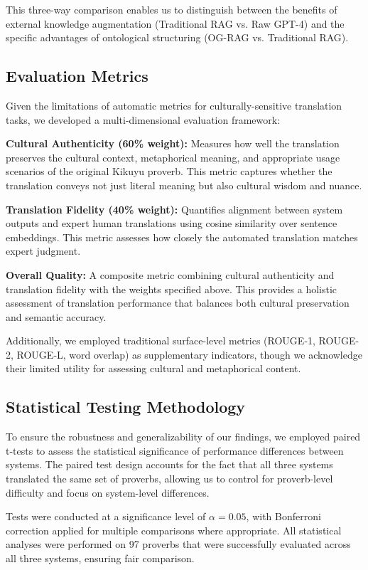 This three-way comparison enables us to distinguish between the benefits of external knowledge augmentation (Traditional RAG vs. Raw GPT-4) and the specific advantages of ontological structuring (OG-RAG vs. Traditional RAG).

\subsection{Evaluation Metrics}

Given the limitations of automatic metrics for culturally-sensitive translation tasks, we developed a multi-dimensional evaluation framework:

\textbf{Cultural Authenticity (60\% weight):} Measures how well the translation preserves the cultural context, metaphorical meaning, and appropriate usage scenarios of the original Kikuyu proverb. This metric captures whether the translation conveys not just literal meaning but also cultural wisdom and nuance.

\textbf{Translation Fidelity (40\% weight):} Quantifies alignment between system outputs and expert human translations using cosine similarity over sentence embeddings. This metric assesses how closely the automated translation matches expert judgment.

\textbf{Overall Quality:} A composite metric combining cultural authenticity and translation fidelity with the weights specified above. This provides a holistic assessment of translation performance that balances both cultural preservation and semantic accuracy.

Additionally, we employed traditional surface-level metrics (ROUGE-1, ROUGE-2, ROUGE-L, word overlap) as supplementary indicators, though we acknowledge their limited utility for assessing cultural and metaphorical content.

\subsection{Statistical Testing Methodology}

To ensure the robustness and generalizability of our findings, we employed paired t-tests to assess the statistical significance of performance differences between systems. The paired test design accounts for the fact that all three systems translated the same set of proverbs, allowing us to control for proverb-level difficulty and focus on system-level differences.

Tests were conducted at a significance level of $\alpha = 0.05$, with Bonferroni correction applied for multiple comparisons where appropriate. All statistical analyses were performed on 97 proverbs that were successfully evaluated across all three systems, ensuring fair comparison.

